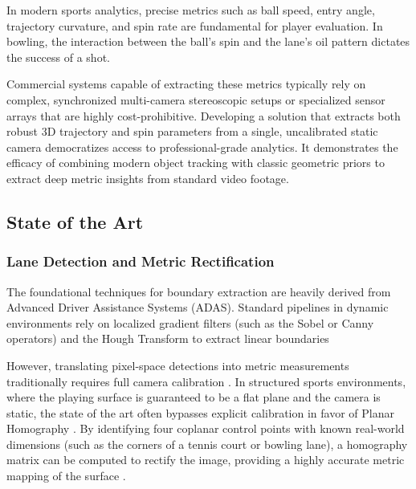 In modern sports analytics, precise metrics such as ball speed, entry angle, trajectory curvature, and spin rate are fundamental for player evaluation. In bowling, the interaction between the ball's spin and the lane's oil pattern dictates the success of a shot.

Commercial systems capable of extracting these metrics typically rely on complex, synchronized multi-camera stereoscopic setups or specialized sensor arrays that are highly cost-prohibitive. Developing a solution that extracts both robust 3D trajectory and spin parameters from a single, uncalibrated static camera democratizes access to professional-grade analytics. It demonstrates the efficacy of combining modern object tracking with classic geometric priors to extract deep metric insights from standard video footage.

\subsection{State of the Art}
\subsubsection{Lane Detection and Metric Rectification}
The foundational techniques for boundary extraction are heavily derived from Advanced Driver Assistance Systems (ADAS). Standard pipelines in dynamic environments rely on localized gradient filters (such as the Sobel or Canny operators) and the Hough Transform to extract linear boundaries \cite{DBLP:journals/corr/Aly14}

However, translating pixel-space detections into metric measurements traditionally requires full camera calibration \cite{888718}. In structured sports environments, where the playing surface is guaranteed to be a flat plane and the camera is static, the state of the art often bypasses explicit calibration in favor of Planar Homography  \cite {Hartley_Zisserman_2004}. By identifying four coplanar control points with known real-world dimensions (such as the corners of a tennis court or bowling lane), a homography matrix can be computed to rectify the image, providing a highly accurate metric mapping of the surface \cite{YU2009643}.

